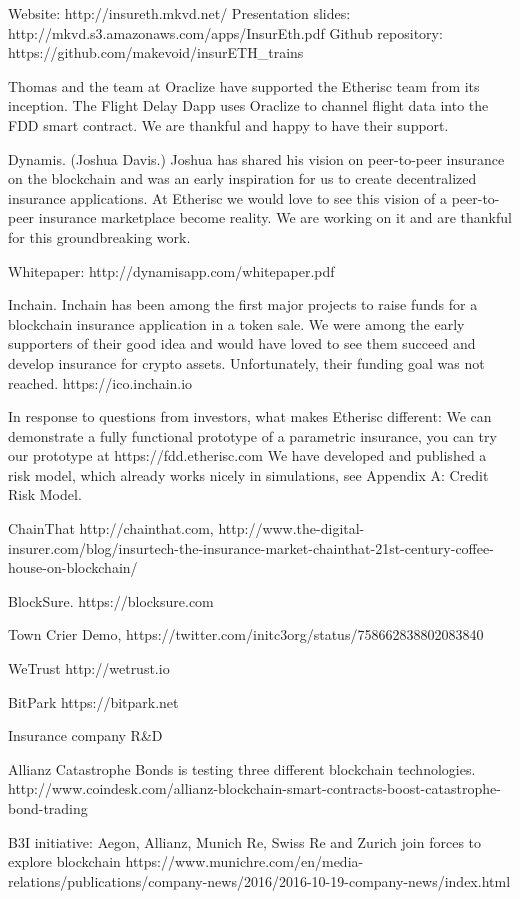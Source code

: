 \documentclass[12pt]{article}
\begin{document}
Website: http://insureth.mkvd.net/
Presentation slides: http://mkvd.s3.amazonaws.com/apps/InsurEth.pdf 
Github repository: https://github.com/makevoid/insurETH_trains 

Thomas and the team at Oraclize have supported the Etherisc team from its inception. The Flight Delay Dapp uses Oraclize to channel flight data into the FDD smart contract. We are thankful and happy to have their support.

Dynamis. (Joshua Davis.) Joshua has shared his vision on peer-to-peer insurance on the blockchain and was an early inspiration for us to create decentralized insurance applications. At Etherisc we would love to see this vision of a peer-to-peer insurance marketplace become reality. We are working on it and are thankful for this groundbreaking work.

Whitepaper: http://dynamisapp.com/whitepaper.pdf

Inchain. Inchain has been among the first major projects to raise funds for a blockchain insurance application in a token sale. We were among the early supporters of their good idea and would have loved to see them succeed and develop insurance for crypto assets. Unfortunately, their funding goal was not reached. https://ico.inchain.io 

In response to questions from investors, what makes Etherisc different:
We can demonstrate a fully functional prototype of a parametric insurance, you can try our prototype at https://fdd.etherisc.com
We have developed and published a risk model, which already works nicely in simulations, see Appendix A: Credit Risk Model.


ChainThat 
http://chainthat.com, http://www.the-digital-insurer.com/blog/insurtech-the-insurance-market-chainthat-21st-century-coffee-house-on-blockchain/


BlockSure.
https://blocksure.com


Town Crier Demo, 
https://twitter.com/initc3org/status/758662838802083840


WeTrust
http://wetrust.io


BitPark
https://bitpark.net

Insurance company R&D 


Allianz Catastrophe Bonds is testing three different blockchain technologies. http://www.coindesk.com/allianz-blockchain-smart-contracts-boost-catastrophe-bond-trading


B3I initiative: Aegon, Allianz, Munich Re, Swiss Re and Zurich join forces to explore blockchain https://www.munichre.com/en/media-relations/publications/company-news/2016/2016-10-19-company-news/index.html
\end{document}
